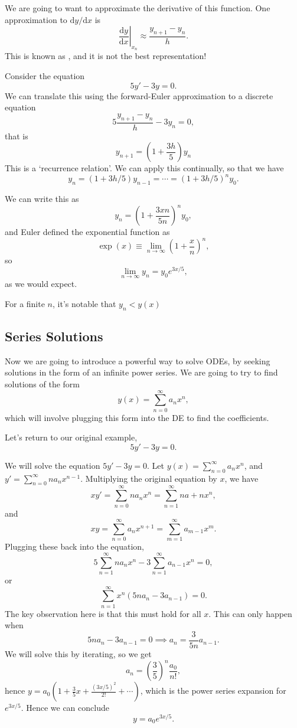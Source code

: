 \documentclass[a4paper]{scrreprt}
\newcommand{\dd}{\mathrm{d}}
\begin{document}
We are going to want to approximate the derivative of this function.
One approximation to $\dd y / \dd x$ is
$$
\left.\frac{\dd y}{\dd x}\right|_{x_n} \approx \frac{y_{n + 1} - y_{n}}{h}. 
$$
This is known as , and it is not the best representation!

\begin{example}
	Consider the equation
	$$
	5y' - 3y = 0.
	$$
	We can translate this using the forward-Euler approximation to a discrete equation
	$$
5 \frac{y_{n + 1} - y_n}{h} - 3y_n = 0,
	$$
	that is
	$$
y_{n + 1} = \left(1 + \frac{3h}{5}\right)y_n
	$$
	This is a `recurrence relation'. We can apply this continually, so that we have
	$$
	y_n = (1 + 3h/5)y_{n - 1} = \cdots = (1 + 3h/5)^n y_0.
	$$
\end{example}

We can write this as
$$
y_n = \left(1 + \frac{3xn}{5n}\right)^n y_0,
$$
and Euler defined the exponential function as
$$
\exp(x) \equiv \lim_{n \to \infty} \left(1 + \frac{x}{n}\right)^n,
$$
so 
$$
\lim_{n \to \infty} y_n = y_0 e^{3x/5},
$$
as we would expect.

For a finite $n$, it's notable that $y_n < y(x)$

\subsection{Series Solutions}

Now we are going to introduce a powerful way to solve ODEs, by seeking solutions in the form of an infinite power series. We are going to try to find solutions of the form
$$
y(x) = \sum_{n = 0}^{\infty} a_n x^n,
$$
which will involve plugging this form into the DE to find the coefficients.

Let's return to our original example,
$$
5y' - 3y = 0.
$$

\begin{example}
	We will solve the equation $5y' - 3y = 0$.
	Let $y(x) = \sum_{n = 0}^{\infty} a_n x^n$, and $y' = \sum_{n = 0}^{\infty} n a_n x^{n - 1}$.
	Multiplying the original equation by $x$, we have
	$$
	xy' = \sum_{n = 0}^{\infty} n a_n x^{n} = \sum_{n = 1}^{\infty} n a+n x^n,
	$$
	and
	$$
	xy =  \sum_{n = 0}^{\infty} a_n x^{n + 1} = \sum_{m = 1}^{\infty} a_{m - 1} x^m.
	$$
	Plugging these back into the equation,
	$$
5	\sum_{n = 1}^{\infty} n a_n x^n - 3 \sum_{n = 1}^{\infty} a_{n - 1}x^n = 0,
	$$
	or 
	$$
	\sum_{n = 1}^{\infty} x^n (5n a_n - 3a_{n - 1}) = 0.
	$$
	The key observation here is that this must hold for all $x$. This can only happen when
	$$
	5n a_n - 3 a_{n - 1} = 0 \implies a_n = \frac{3}{5n} a_{n - 1}.
	$$
	We will solve this by iterating, so we get
	$$
	a_n = \left(\frac{3}{5}\right)^n \frac{a_0}{n!},
	$$
	hence $y = a_0\left(1 + \frac{3}{5}x + \frac{(3x/5)^2}{2!} + \cdots\right)$,
	which is the power series expansion for $e^{3x/5}$.
	Hence we can conclude
	$$
y = a_0 e^{3x/5}.
	$$
\end{example}
\end{document}
